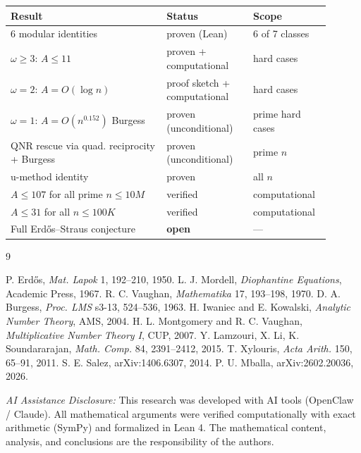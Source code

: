 \documentclass[11pt]{article}
\theoremstyle{remark}
\begin{document}
\begin{center}
\begin{tabular}{p{0.45\linewidth}p{0.25\linewidth}p{0.2\linewidth}}
\toprule
Result & Status & Scope \\
\midrule
6 modular identities & proven (Lean) & 6 of 7 classes \\
$\omega \geq 3$: $A \leq 11$ & proven + computational & hard cases \\
$\omega = 2$: $A = O(\log n)$ & proof sketch + computational & hard cases \\
$\omega = 1$: $A = O(n^{0.152})$ Burgess & proven (unconditional) & prime hard cases \\
QNR rescue via quad. reciprocity + Burgess & proven (unconditional) & prime $n$ \\
u-method identity & proven & all $n$ \\
$A \leq 107$ for all prime $n \leq 10M$ & verified & computational \\
$A \leq 31$ for all $n \leq 100K$ & verified & computational \\
Full Erd\H{o}s--Straus conjecture & \textbf{open} & --- \\
\bottomrule
\end{tabular}
\end{center}

\begin{thebibliography}{9}

 P. Erd\H{o}s, \emph{Mat. Lapok} 1, 192--210, 1950.
 L. J. Mordell, \emph{Diophantine Equations}, Academic Press, 1967.
 R. C. Vaughan, \emph{Mathematika} 17, 193--198, 1970.
 D. A. Burgess, \emph{Proc. LMS} s3-13, 524--536, 1963.
 H. Iwaniec and E. Kowalski, \emph{Analytic Number Theory}, AMS, 2004.
 H. L. Montgomery and R. C. Vaughan, \emph{Multiplicative Number Theory I}, CUP, 2007.
 Y. Lamzouri, X. Li, K. Soundararajan, \emph{Math. Comp.} 84, 2391--2412, 2015.
 T. Xylouris, \emph{Acta Arith.} 150, 65--91, 2011.
 S. E. Salez, arXiv:1406.6307, 2014.
 P. U. Mballa, arXiv:2602.20036, 2026.

\end{thebibliography}

\bigskip
\noindent\textit{AI Assistance Disclosure:} This research was developed with AI tools (OpenClaw / Claude). All mathematical arguments were verified computationally with exact arithmetic (SymPy) and formalized in Lean 4. The mathematical content, analysis, and conclusions are the responsibility of the authors.
\end{document}
